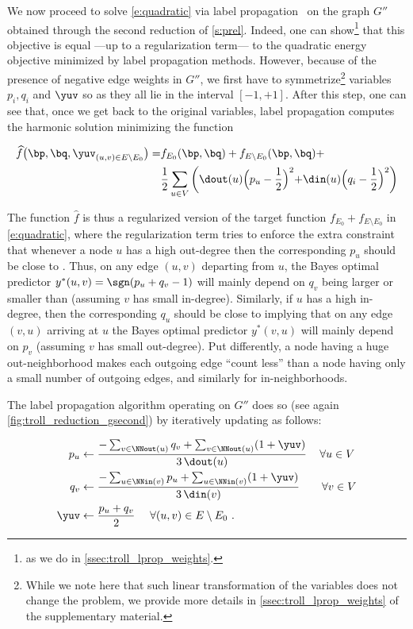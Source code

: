 We now proceed to solve \eqref{e:quadratic} via label propagation~\autocite{LabelPropa03} on the
graph $G''$ obtained through the second reduction of \autoref{s:prel}.
Indeed, one can show\footnote{as we do in \autoref{ssec:troll_lprop_weights}.} that this objective is
equal ---up to a regularization term--- to the quadratic energy objective minimized by label
propagation methods.
However, because of the presence of negative edge weights in $G''$, we first have to symmetrize\footnote{%
While we note here that such linear transformation of the variables does not change the problem, we
provide more details in \autoref{ssec:troll_lprop_weights} of the supplementary material.} variables
$p_i, q_i$ and $\yuv$ so as they all lie in the interval $[-1,+1]$.
After this step, one can see that, once we get back to the original variables, label propagation
computes the harmonic solution minimizing the function

\begin{align*}
{\widehat f}\big(\bp,\bq,{\yuv}_{(u,v) \in E\setminus E_0}\big)
= &f_{E_0}(\bp,\bq) + f_{E\setminus E_0}(\bp,\bq) +\\
  &\frac{1}{2}\sum_{u\in V}
\left(\dout(u)\Bigl(p_u-\frac{1}{2}\Bigl)^2+\din(u)\Bigl(q_i-\frac{1}{2}\Bigl)^2\right)
\end{align*}

The function ${\widehat f}$ is thus a regularized version of the target function $f_{E_0} +
f_{E\setminus E_0}$ in \eqref{e:quadratic}, where the regularization term tries to enforce the extra
constraint that whenever a node $u$ has a high out-degree then the corresponding $p_u$ should be
close to \shalf. Thus, on any edge $(u,v)$ departing from $u$, the Bayes optimal predictor $y^*(u,v)
= \sgn(p_u+q_v-1)$ will mainly depend on $q_v$ being larger or smaller than \shalf{} (assuming $v$
has small in-degree). Similarly, if $u$ has a high in-degree, then the corresponding $q_u$ should be
close to \shalf{} implying that on any edge $(v,u)$ arriving at $u$ the Bayes optimal predictor
$y^*(v,u)$ will mainly depend on $p_v$ (assuming $v$ has small out-degree). Put differently, a node
having a huge out-neighborhood makes each outgoing edge \enquote{count less} than a node having only
a small number of outgoing edges, and similarly for in-neighborhoods.

The label propagation algorithm operating on $G''$ does so (see again
\autoref{fig:troll_reduction_gsecond}) by iteratively updating as follows:

\begin{align*}
  p_{u}  & \leftarrow \frac{-\sum_{v \in \NNout(u)} q_{v} + \sum_{v \in \NNout(u)} (1+\yuv)}{3\,\dout(u)}\,\quad\forall u\in V\\
  q_{v}  & \leftarrow \frac{-\sum_{u \in  \NNin(v)} p_{u} + \sum_{u \in \NNin(v) } (1+\yuv)}{3\,\din(v)}\qquad\forall v \in V\\
  \yuv & \leftarrow \frac{p_u + q_v}{2}~ \quad \forall (u,v) \in E\setminus E_0~.
\end{align*}

